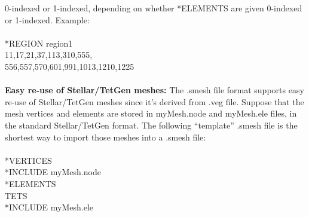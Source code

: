 \documentclass[11pt,fullpage]{article}
\begin{document}
0-indexed or 1-indexed, depending on whether *ELEMENTS are given
0-indexed or 1-indexed. Example:
\\\\
\noindent{}*REGION region1\\
\noindent{}11,17,21,37,113,310,555,\\
\noindent{}556,557,570,601,991,1013,1210,1225
\\\\
\noindent{}\textbf{Easy re-use of Stellar/TetGen meshes:} The .smesh file format supports
easy re-use of Stellar/TetGen meshes since it's derived from .veg
file. Suppose that the mesh vertices and elements are stored in
myMesh.node and myMesh.ele files, in the standard Stellar/TetGen
format. The following ``template'' .smesh file is the shortest way to
import those meshes into a .smesh file:
\\\\
\noindent{}*VERTICES\\
*INCLUDE myMesh.node\\
*ELEMENTS\\
TETS\\
*INCLUDE myMesh.ele



\end{document}
